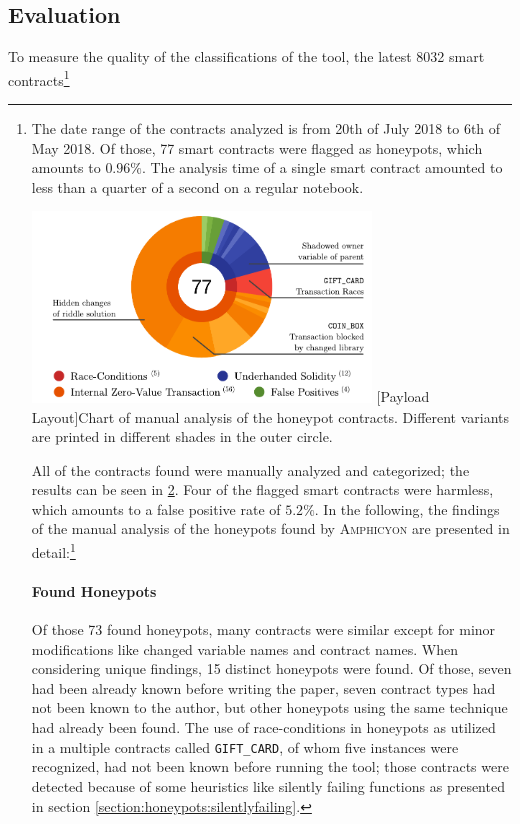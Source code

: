 \subsection{Evaluation}
To measure the quality of the classifications of the tool, the latest 8032 smart contracts\footnote{The date range of the contracts analyzed is from 20th of July 2018 to 6th of May 2018. Of those, 77 smart contracts were flagged as honeypots, which amounts to \( 0.96 \% \). The analysis time of a single smart contract amounted to less than a quarter of a second on a regular notebook.

\vspace{1em}
\begin{minipage}{\linewidth}
	\centering
	\includegraphics[width=9cm]{img/amphicyon/analysis.pdf}
	[Payload Layout]{Chart of manual analysis of the honeypot contracts. Different variants are printed in different shades in the outer circle.}
	\label{fig:honeypotchart}
\end{minipage}

All of the contracts found were manually analyzed and categorized; the results can be seen in \ref{fig:honeypotchart}. Four of the flagged smart contracts were harmless, which amounts to a false positive rate of \( 5.2 \% \). In the following, the findings of the manual analysis of the honeypots found by \textsc{Amphicyon} are presented in detail:\footnote{The notes on the manual classification can be found inside the folder \texttt{misc} in the repository.}

\paragraph{Found Honeypots}
Of those 73 found honeypots, many contracts were similar except for minor modifications like changed variable names and contract names. When considering unique findings, 15 distinct honeypots were found. Of those, seven had been already known before writing the paper, seven  contract types had not been known to the author, but other honeypots using the same technique had already been found. The use of race-conditions in honeypots as utilized in a multiple contracts called \texttt{GIFT_CARD}, of whom five instances were recognized, had not been known before running the tool; those contracts were detected because of some heuristics like silently failing functions as presented in section \ref{section:honeypots:silentlyfailing}.

}
